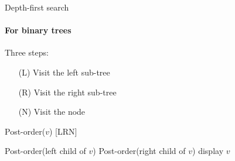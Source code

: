 \documentclass{beamer}
\begin{document}
\begin{frame}[fragile]{Depth-first search}
  \framesubtitle{For binary trees}
  
  \begin{block}{}
    Three steps:
    \begin{itemize}
      \item[(L)] Visit the left sub-tree
      \item[(R)] Visit the right sub-tree
      \item[(N)] Visit the node
    \end{itemize}
  \end{block}
  
  \begin{code}{Post-order($v$)  [LRN]}
    \begin{PseudoCode}
Post-order(left child of $v$)
Post-order(right child of $v$)
display $v$
    \end{PseudoCode}
  \end{code}  
\end{frame}
\end{document}
